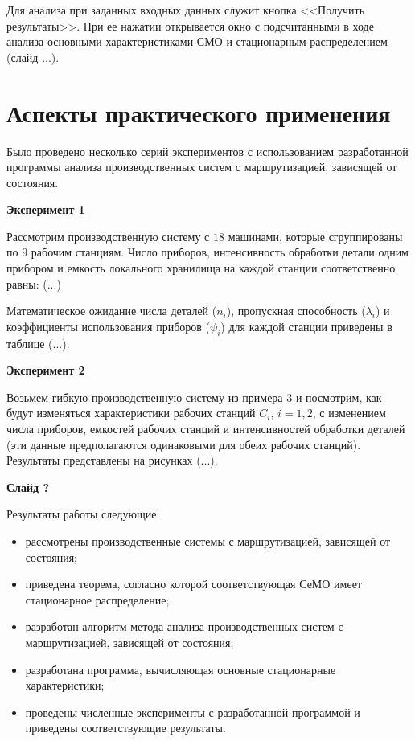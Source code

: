 \documentclass[a4paper,14pt]{extarticle}
\theoremstyle{note}
\begin{document}
Для анализа при заданных входных данных служит кнопка <<Получить результаты>>. При ее нажатии открывается окно с подсчитанными в ходе анализа основными характеристиками СМО и стационарным распределением (слайд ...).




\section{Аспекты практического применения}
\label{sec:practical_application}

Было проведено несколько серий экспериментов с использованием разработанной программы анализа производственных систем с маршрутизацией, зависящей от состояния.

\textbf{Эксперимент 1}

Рассмотрим производственную систему с $18$ машинами, которые сгруппированы по $9$ рабочим станциям. Число приборов, интенсивность обработки детали одним прибором и емкость локального хранилища на каждой станции соответственно равны: (...)

Математическое ожидание числа деталей ($\overline{n}_i$), пропускная способность ($\lambda_i$) и коэффициенты использования приборов ($\psi_i$) для каждой станции приведены в таблице (...).

\textbf{Эксперимент 2}

Возьмем гибкую производственную систему из примера 3 и посмотрим, как будут изменяться характеристики рабочих станций $C_i$, $i=1,2$, с изменением числа приборов, емкостей рабочих станций и интенсивностей обработки деталей (эти данные предполагаются одинаковыми для обеих рабочих станций). Результаты представлены на рисунках (...).



\textbf{Слайд ?}

Результаты работы следующие:

\begin{itemize}
\item рассмотрены производственные системы с маршрутизацией, зависящей от состояния;
\item приведена теорема, согласно которой соответствующая СеМО имеет стационарное распределение;
\item разработан алгоритм метода анализа производственных систем с маршрутизацией, зависящей от состояния;
\item разработана программа, вычисляющая основные стационарные характеристики;
\item проведены численные эксперименты с разработанной программой и приведены соответствующие результаты.
\end{itemize}
\end{document}
